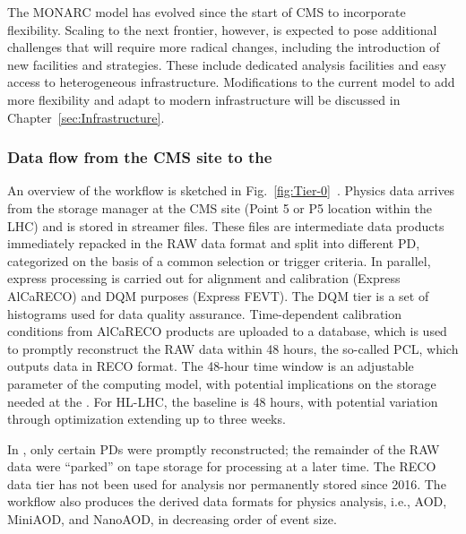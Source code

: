 The \gls{MONARC} model has evolved since the start of CMS to incorporate flexibility. Scaling to the next frontier, however, is expected to pose additional challenges that will require more radical changes, including the introduction of new facilities and strategies. These include dedicated analysis facilities and easy access to heterogeneous infrastructure. Modifications to the current model to add more flexibility and adapt to modern infrastructure will be discussed in Chapter~\ref{sec:Infrastructure}.

\subsubsection{Data flow from the CMS site to the \TierZero}


An overview of the \TierZero workflow is sketched in Fig.~\ref{fig:Tier-0}~\cite{Amado:2024uiy}. Physics data arrives from the storage manager at the CMS site (Point 5 or P5 location within the LHC) and is stored in streamer files. These files are intermediate data products immediately repacked in the \gls{RAW} data format and split into different \gls{PD}, categorized on the basis of a common selection or trigger criteria.
In parallel, express processing is carried out for alignment and calibration (Express AlCaRECO) and \gls{DQM} purposes (Express \gls{FEVT}). The \gls{DQM} tier is a set of histograms used for data quality assurance. Time-dependent calibration conditions from AlCaRECO products are uploaded to a database, which is used to promptly reconstruct the \gls{RAW} data within 48 hours, the so-called \gls{PCL}, which outputs data in \gls{RECO} format. The 48-hour time window is an adjustable parameter of the computing model, with potential implications on the storage needed at the \TierZero. For \gls{HL-LHC}, the baseline is 48 hours, with potential variation through optimization extending up to three weeks.

In \RunTwo, only certain \glspl{PD} were promptly reconstructed; the remainder of the \gls{RAW} data were ``parked'' on tape storage for processing at a later time. The \gls{RECO} data tier has not been used for analysis nor permanently stored since 2016. The \TierZero workflow also produces the derived data formats for physics analysis, i.e., \gls{AOD}, MiniAOD, and NanoAOD, in decreasing order of event size.

